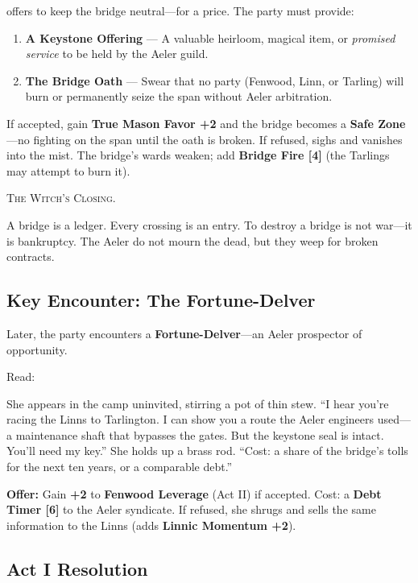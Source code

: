\documentclass[11pt,a5paper]{book}
\newcommand{\timer}[1]{\textbf{[#1]}}
\newenvironment{witchclosing}
  {\begin{quoting}[font={small\itshape}, leftmargin=2em, rightmargin=2em]\noindent\textsc{The Witch's Closing.}\par}
  {\end{quoting}}
\begin{document}
\orin{} offers to keep the bridge neutral---for a price. The party must provide:
\begin{enumerate}[leftmargin=*]
\item \textbf{A Keystone Offering} --- A valuable heirloom, magical item, or \textit{promised service} to be held by the Aeler guild.
\item \textbf{The Bridge Oath} --- Swear that no party (Fenwood, Linn, or Tarling) will burn or permanently seize the span without Aeler arbitration.
\end{enumerate}

If accepted, gain \textbf{True Mason Favor +2} and the bridge becomes a \textbf{Safe Zone}---no fighting on the span until the oath is broken. If refused, \orin{} sighs and vanishes into the mist. The bridge's wards weaken; add \textbf{Bridge Fire \timer{4}} (the Tarlings may attempt to burn it).

\begin{witchclosing}
A bridge is a ledger. Every crossing is an entry. To destroy a bridge is not war---it is bankruptcy. The Aeler do not mourn the dead, but they weep for broken contracts.
\end{witchclosing}

\subsection*{Key Encounter: The Fortune-Delver}

Later, the party encounters a \textbf{Fortune-Delver}---an Aeler prospector of opportunity.

Read:
\begin{quoting}
She appears in the camp uninvited, stirring a pot of thin stew. ``I hear you're racing the Linns to Tarlington. I can show you a route the Aeler engineers used---a maintenance shaft that bypasses the gates. But the keystone seal is intact. You'll need my key.'' She holds up a brass rod. ``Cost: a share of the bridge's tolls for the next ten years, or a comparable debt.''
\end{quoting}

\textbf{Offer:} Gain \textbf{+2} to \textbf{Fenwood Leverage} (Act II) if accepted. Cost: a \textbf{Debt Timer \timer{6}} to the Aeler syndicate. If refused, she shrugs and sells the same information to the Linns (adds \textbf{Linnic Momentum +2}).

\subsection*{Act I Resolution}
\end{document}
